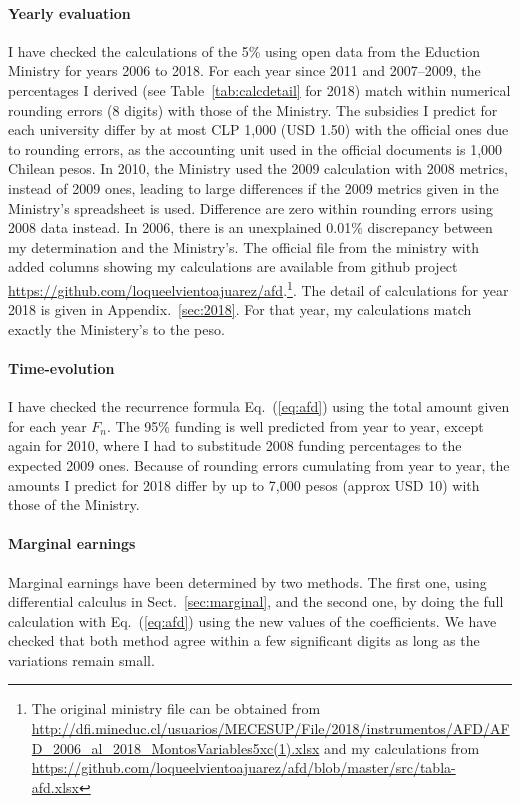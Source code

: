 \documentclass[twocolumn]{article}
\def\eqref#1{Eq.~(\ref{eq:#1})}
\begin{document}
\paragraph{Yearly evaluation} I have checked the calculations of the 5\% using open data from the Eduction Ministry for
years 2006 to 2018. For each year since 2011 and 2007--2009, the percentages I
derived (see Table~\ref{tab:calcdetail} for 2018) match within numerical
rounding errors (8 digits) with those of the Ministry. The subsidies I predict
for each university differ by at most CLP 1,000 (USD 1.50) with the
official ones due to rounding errors, as the accounting unit used in the
official documents is 1,000 Chilean pesos. In 2010, the Ministry used the 2009
calculation with 2008 metrics, instead of 2009 ones, leading to large differences if the 2009 metrics given in the Ministry's spreadsheet is used.  Difference are zero within rounding errors using 2008 data instead. In 2006, there is an unexplained 0.01\% discrepancy between my determination and the Ministry's.  The official file from the ministry with added columns showing my calculations are available from github project \url{https://github.com/loqueelvientoajuarez/afd}.\footnote{The original ministry file can
be obtained from \url{http://dfi.mineduc.cl/usuarios/MECESUP/File/2018/instrumentos/AFD/AFD_2006_al_2018_MontosVariables5xc(1).xlsx} and my calculations from \url{https://github.com/loqueelvientoajuarez/afd/blob/master/src/tabla-afd.xlsx}}. 
The detail of calculations for year 2018 is given in Appendix.~\ref{sec:2018}.
For that year, my calculations match exactly the Ministery's to the peso.

\paragraph{Time-evolution} I have checked the recurrence formula \eqref{afd} using the total amount given for each year $F_n$.  The 95\% funding is well predicted from year to year, except again for 2010, where I had to substitude 2008 funding percentages to the expected 2009 ones. Because of rounding errors cumulating from year to year, the amounts I predict for 2018 differ by up to 7,000 pesos (approx USD 10) with those of the Ministry.

\paragraph{Marginal earnings}  Marginal earnings have been determined by two methods.  The first one, using differential calculus in Sect.~\ref{sec:marginal}, and the second one, by doing the full calculation with \eqref{afd} using the new values of the coefficients.  We have checked that both method agree within a few significant digits as long as the variations remain small.
\end{document}
